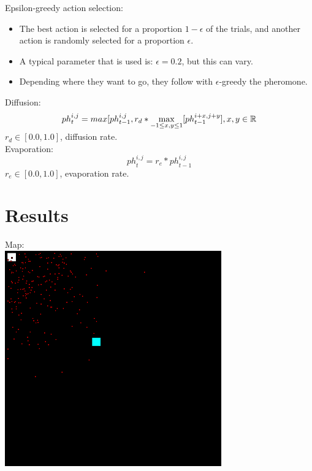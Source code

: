 \documentclass{beamer}
\begin{document}
\begin{frame}
Epsilon-greedy action selection:
\begin{itemize}
\item The best action is selected for a proportion $1 - \epsilon$ of the trials, and another action is randomly selected for a proportion $\epsilon$.
\item A typical parameter that is used is: $\epsilon = 0.2$, but this can vary.
\item Depending where they want to go, they follow with $\epsilon$-greedy the  pheromone.
\end{itemize}
\end{frame}

\begin{frame}
Diffusion:
\begin{equation}
{ph}_t^{i,j} = max[{ph}_{t-1}^{i,j}, r_d * \smash{\displaystyle\max_{-1 \leq x,y \leq 1}}[{ph}_{t-1}^{i+x,j+y}], x,y \in \mathbb{R}
\end{equation}
$r_d \in [0.0,1.0]$, diffusion rate.\\
\vspace{0.6cm}
Evaporation:
\begin{equation}
{ph}_t^{i,j} = r_e * {ph}_{t-1}^{i,j}
\end{equation}
$r_e \in [0.0,1.0]$, evaporation rate.\\
\end{frame}

\section{Results}
\begin{frame}
Map:\\
\includegraphics[width=0.7\textwidth]{map.png}
\end{frame}
\end{document}
